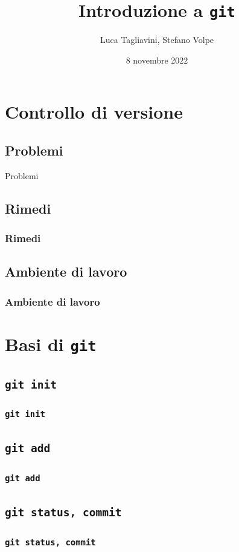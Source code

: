 \documentclass{beamer}
\title{Introduzione a \texttt{git}}
\author{Luca Tagliavini, Stefano Volpe}
\institute{Università di Bologna, corso di Laurea in Informatica}
\date{8 novembre 2022}
\begin{document}
\begin{frame} 
  \titlepage
\end{frame}

\section{Controllo di versione}

\subsection{Problemi}
\begin{frame}{Problemi}
\end{frame}

\subsection{Rimedi}
\begin{frame}
  \frametitle{Rimedi}
\end{frame}

\subsection{Ambiente di lavoro}
\begin{frame}
  \frametitle{Ambiente di lavoro}
\end{frame}

\section{Basi di \texttt{git}}

\subsection{\texttt{git init}}
\begin{frame}
  \frametitle{\texttt{git init}}
\end{frame}

\subsection{\texttt{git add}}
\begin{frame}
  \frametitle{\texttt{git add}}
\end{frame}

\subsection{\texttt{git status, commit}}
\begin{frame}
  \frametitle{\texttt{git status, commit}}
\end{frame}
\end{document}
